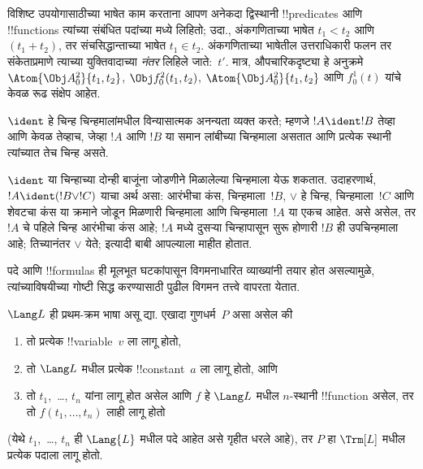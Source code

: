 \documentclass[../../../include/open-logic-section]{subfiles}
\begin{document}
विशिष्ट उपयोगासाठीच्या भाषेत काम करताना आपण अनेकदा द्विस्थानी
!!{predicate}s आणि !!{function}s त्यांच्या संबंधित पदांच्या मध्ये
लिहितो; उदा., अंकगणिताच्या भाषेत $t_1 < t_2$ आणि $(t_1 + t_2)$, तर
संचसिद्धान्ताच्या भाषेत $t_1 \in t_2$. अंकगणिताच्या भाषेतील उत्तराधिकारी
फलन तर संकेताप्रमाणे त्याच्या युक्तिवादाच्या \emph{नंतर} लिहिले
जाते:~$t'$. मात्र, औपचारिकदृष्ट्या हे अनुक्रमे
$\Atom{\Obj A^2_0}{t_1, t_2}$, $\Obj f^2_0(t_1, t_2)$,
$\Atom{\Obj A^2_0}{t_1, t_2}$ आणि $f^1_0(t)$ यांचे केवळ रूढ संक्षेप आहेत.

\begin{defn}[विन्यासात्मक अनन्यता]
$\ident$ हे चिन्ह चिन्हमालांमधील विन्यासात्मक अनन्यता व्यक्त करते;
म्हणजे $!A \ident !B$ तेव्हा आणि केवळ तेव्हाच, जेव्हा $!A$ आणि $!B$
या समान लांबीच्या चिन्हमाला असतात आणि प्रत्येक स्थानी त्यांच्यात तेच
चिन्ह असते.
\end{defn}

$\ident$ या चिन्हाच्या दोन्ही बाजूंना जोडणीने मिळालेल्या चिन्हमाला
येऊ शकतात. उदाहरणार्थ, $!A \ident (!B \lor !C)$ याचा अर्थ असा:
आरंभीचा कंस, चिन्हमाला~$!B$, $\lor$ हे चिन्ह, चिन्हमाला~$!C$ आणि
शेवटचा कंस या क्रमाने जोडून मिळणारी चिन्हमाला आणि चिन्हमाला~$!A$
या एकच आहेत. असे असेल, तर $!A$ चे पहिले चिन्ह आरंभीचा कंस आहे;
$!A$ मध्ये दुसऱ्या चिन्हापासून सुरू होणारी $!B$ ही उपचिन्हमाला आहे;
तिच्यानंतर $\lor$ येते; इत्यादी बाबी आपल्याला माहीत होतात.

पदे आणि !!{formula}s ही मूलभूत घटकांपासून विगमनाधारित व्याख्यांनी तयार
होत असल्यामुळे, त्यांच्याविषयीच्या गोष्टी सिद्ध करण्यासाठी पुढील विगमन
तत्त्वे वापरता येतात.

\begin{lem}
    $\Lang L$ ही प्रथम-क्रम भाषा असू द्या.
    एखादा गुणधर्म~$P$ असा असेल की
    \begin{enumerate}
        \item तो प्रत्येक !!{variable}~$v$ ला लागू होतो,
        \item तो $\Lang L$ मधील प्रत्येक !!{constant}~$a$ ला लागू होतो, आणि
        \item तो $t_1$,~\dots, $t_n$ यांना लागू होत असेल आणि $f$ हे
        $\Lang L$ मधील $n$-स्थानी !!{function} असेल, तर तो
        $f(t_1,\dotsc,t_n)$ लाही लागू होतो
    \end{enumerate}
    (येथे $t_1$,~\dots, $t_n$ ही $\Lang{L}$ मधील पदे आहेत असे गृहीत धरले आहे),
    तर $P$ हा $\Trm[L]$ मधील प्रत्येक पदाला लागू होतो.
\end{lem}
\end{document}
